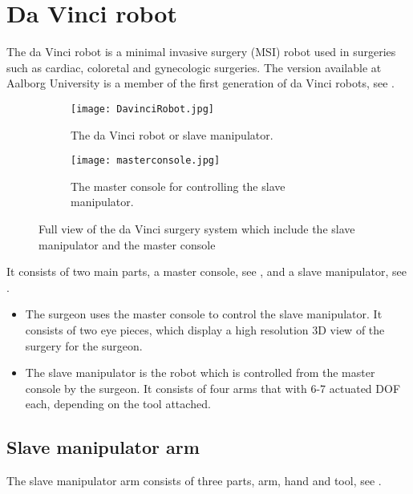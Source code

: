 \section{Da Vinci robot}\label{sec:da_vin_rob}

The da Vinci robot is a minimal invasive surgery (MSI) robot used in surgeries such as cardiac, coloretal and gynecologic surgeries\cite{daVinciSurgery}. The version available at Aalborg University is a member of the first generation of da Vinci robots, see .

\begin{figure}[H]
	\centering
	\begin{subfigure}{.45\textwidth}
		\centering
		\texttt{[image: DavinciRobot.jpg]}
		\caption{The da Vinci robot or slave manipulator.}
		\label{fig:davincirobot}
	\end{subfigure}
	\begin{subfigure}{.45\textwidth}
		\centering
		\vspace{12pt}
		\texttt{[image: masterconsole.jpg]}
		\caption{The master console for controlling the slave manipulator.}
		\label{fig:mastermani}
	\end{subfigure}
\caption{Full view of the da Vinci surgery system which include the slave manipulator and the master console}
\label{fig:fulldavinci}
\end{figure}

It consists of two main parts, a master console, see , and a slave manipulator, see .

\begin{itemize}
\item The surgeon uses the master console to control the slave manipulator. It consists of two eye pieces, which display a high resolution 3D view of the surgery for the surgeon. 
\item The slave manipulator is the robot which is controlled from the master console by the surgeon. It consists of four arms that with 6-7 actuated \gls{DOF} each, depending on the tool attached.
\end{itemize}




\subsection*{Slave manipulator arm}
The slave manipulator arm consists of three parts, arm, hand and tool, see .

